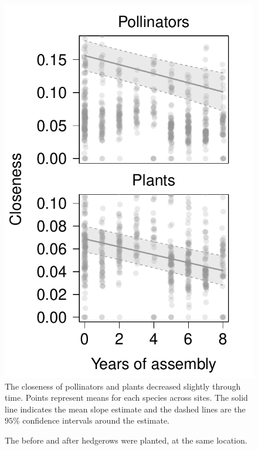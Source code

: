 \documentclass[12pt]{article}
\begin{document}
\begin{figure}
  \centering
  \includegraphics[width=.6\textwidth]{../analysis/speciesLevel/figures/closenessPanel.pdf}
  \caption{The closeness of pollinators and plants decreased slightly
    through time. Points represent means for each species across
    sites. The solid line indicates the mean slope estimate and the
    dashed lines are the $95\%$ confidence intervals around the
    estimate.}
  \label{fig:closeness}
\end{figure}
\clearpage

\begin{figure}[!tbp]
  \centering
  \caption{The before and after hedgerows were planted, at the same location.}
\end{figure}
\clearpage
\end{document}
